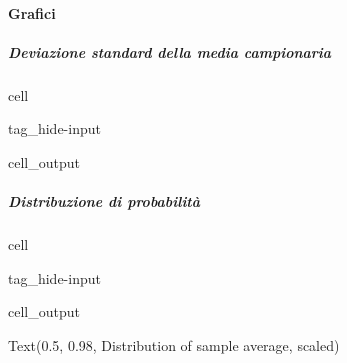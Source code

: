 \documentclass[letterpaper,10pt,italian]{jupyterBook}
\begin{document}
\paragraph{Grafici}
\label{\detokenize{ch/statistics/iid:grafici}}

\subparagraph{Deviazione standard della media campionaria}
\label{\detokenize{ch/statistics/iid:deviazione-standard-della-media-campionaria}}
\begin{sphinxuseclass}{cell}
\begin{sphinxuseclass}{tag_hide-input}\begin{sphinxVerbatimOutput}

\begin{sphinxuseclass}{cell_output}
\noindent{}

\end{sphinxuseclass}\end{sphinxVerbatimOutput}

\end{sphinxuseclass}
\end{sphinxuseclass}

\subparagraph{Distribuzione di probabilità}
\label{\detokenize{ch/statistics/iid:distribuzione-di-probabilita}}
\begin{sphinxuseclass}{cell}
\begin{sphinxuseclass}{tag_hide-input}\begin{sphinxVerbatimOutput}

\begin{sphinxuseclass}{cell_output}
\begin{sphinxVerbatim}[commandchars=\\\{\}]
Text(0.5, 0.98, \PYGZsq{}Distribution of sample average, scaled\PYGZsq{})
\end{sphinxVerbatim}

\noindent{}

\noindent{}

\noindent{}

\end{sphinxuseclass}\end{sphinxVerbatimOutput}

\end{sphinxuseclass}
\end{sphinxuseclass}
\sphinxstepscope
\end{document}
